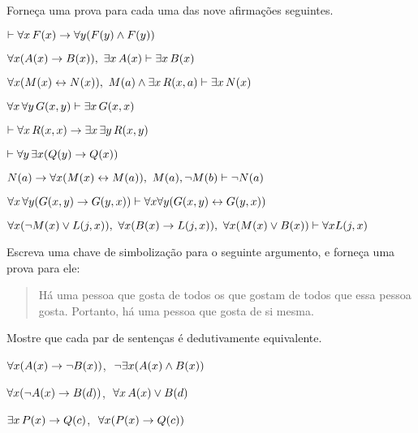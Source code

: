 \problempart
\label{pr.someFOLproofs}
Forneça uma prova para cada uma das nove afirmações seguintes. 
\begin{earg}
\item $\vdash \forall x\,\mathord{F}(x) \rightarrow \forall y(\mathord{F}(y) \wedge \mathord{F}(y))$
\item $\forall x(\mathord{A}(x)\rightarrow \mathord{B}(x)),\,\, \exists x\,\mathord{A}(x) \vdash \exists x\,\mathord{B}(x)$
\item $\forall x(\mathord{M}(x) \leftrightarrow \mathord{N}(x)),\,\, \mathord{M}(a) \wedge \exists x\,\mathord{R}(x,a) \vdash \exists x\,\mathord{N}(x)$
\item $\forall x\, \forall y\,\mathord{G}(x,y)\vdash\exists x\,\mathord{G}(x,x)$
\item $\vdash\forall x\,\mathord{R}(x,x) \rightarrow \exists x\, \exists y\,\mathord{R}(x,y)$
\item $\vdash\forall y\, \exists x (\mathord{Q}(y) \rightarrow \mathord{Q}(x))$
\item $\mathord{N}(a) \rightarrow \forall x(\mathord{M}(x) \leftrightarrow \mathord{M}(a)),\,\, \mathord{M}(a), \neg\mathord{M}(b)\vdash \neg \mathord{N}(a)$
\item $\forall x\, \forall y (\mathord{G}(x,y) \rightarrow \mathord{G}(y,x)) \vdash \forall x\forall y (\mathord{G}(x,y) \leftrightarrow \mathord{G}(y,x))$
\item $\forall x(\neg\mathord{M}(x) \vee \mathord{L}(j,x)), \,\, \forall x(\mathord{B}(x)\rightarrow \mathord{L}(j,x)),\,\, \forall x(\mathord{M}(x)\vee \mathord{B}(x))\vdash \forall x\mathord{L}(j,x)$
\end{earg}
 
\solutions
\problempart
\label{pr.likes}
Escreva uma chave de simbolização para o seguinte argumento, e forneça uma prova para ele:
\begin{quote}
Há uma pessoa que gosta de todos os que gostam de todos que essa pessoa gosta. Portanto, há uma pessoa que gosta de si mesma.
\end{quote}


\problempart
Mostre que cada par de sentenças é dedutivamente equivalente.
\begin{earg}
\item $\forall x (\mathord{A}(x)\rightarrow \neg \mathord{B}(x))$,\,\, $\neg\exists x(\mathord{A}(x) \wedge \mathord{B}(x))$
\item $\forall x (\neg\mathord{A}(x)\rightarrow \mathord{B}(d))$,\,\, $\forall x\,\mathord{A}(x) \vee \mathord{B}(d)$
\item $\exists x\,\mathord{P}(x) \rightarrow \mathord{Q}(c)$,\,\, $\forall x (\mathord{P}(x) \rightarrow \mathord{Q}(c))$
\end{earg}

